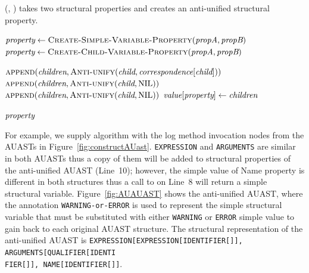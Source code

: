 \begin{algorithm}
 \caption{(, ) takes two structural properties and creates an anti-unified structural property.}
  \label{antiUnify}
  \begin{algorithmic}[1]
\AntiUnifyProperty
{}

	      \State $\textit{property} \gets  \textsc{Create-Simple-Variable-Property}(\textit{propA},\textit{propB})$
			\State $\textit{property} \gets  \textsc{Create-Child-Variable-Property}(\textit{propA},\textit{propB})$
	
	  \State $\textsc{append}(\textit{children},\textsc{Anti-unify}(\textit{child}, \textit{correspondence}[\textit{child}]))$
	   \Else 	
	    \State $\textsc{append}(\textit{children},\textsc{Anti-unify}(\textit{child}, \textrm{NIL}))$
	    \EndIf
      \EndFor
	    \State $\textsc{append}(\textit{children},\textsc{Anti-unify}(\textit{child}, \textrm{NIL}))$
	    \EndIf
      \EndFor
		\State $ \textit{value}[\textit{property}] \gets\textit{children} $

    \EndIf
\Return $\textit{property}$
\end{algorithmic}
\end{algorithm}

For example, we supply  algorithm with the log method invocation nodes from the AUASTs in Figure~\ref{fig:constructAUast}. \texttt{EXPRESSION} and \texttt{ARGUMENTS} are similar in both AUASTs thus a copy of them will be added to structural properties of the anti-unified AUAST (Line~10); however, the simple value of Name property is different in both structures thus a call to  on Line~8 will return a simple structural variable. Figure~\ref{fig:AUAUAST} shows the anti-unified AUAST, where the annotation \texttt{WARNING-or-ERROR} is used to represent the simple structural variable that must be substituted with either \texttt{WARNING} or \texttt{ERROR} simple value to gain back to each original AUAST structure. The structural representation of the anti-unified AUAST is \texttt{EXPRESSION[EXPRESSION[IDENTIFIER[]], ARGUMENTS[QUALIFIER[IDENTI\\FIER[]], NAME[IDENTIFIER[]]}.

